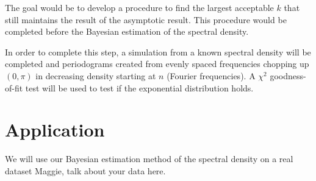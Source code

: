 \documentclass{article}\usepackage[]{graphicx}\usepackage[]{color}
\newcommand{\ak}[1]{{\color{magenta} #1}}
\theoremstyle{plain}
\begin{document}
The goal would be to develop a procedure to find the largest acceptable $k$ that still maintains the result of the asymptotic result. This procedure would be completed before the Bayesian estimation of the spectral density.

In order to complete this step, a simulation from a known spectral density will be completed and periodograms created from evenly spaced frequencies chopping up $(0,\pi)$ in decreasing density starting at $n$ (Fourier frequencies). A $\chi^2$ goodness-of-fit test will be used to test if the exponential distribution holds. 

\section*{Application}
We will use our Bayesian estimation method of the spectral density on a real dataset \ak{Maggie, talk about your data here}.
\end{document}
